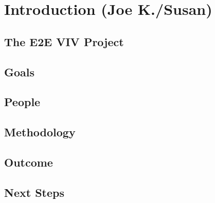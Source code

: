 \chapter{Introduction (Joe K./Susan)}
\label{chapter:introduction}

\section{The E2E VIV Project}
\section{Goals}
\section{People}
\section{Methodology}
\section{Outcome}
\section{Next Steps}
